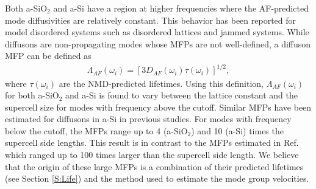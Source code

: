 \documentclass[aps,prb,twocolumn,superscriptaddress,footinbib,amsmath,amssymb,floatfix]{revtex4}
\begin{document}
Both a-SiO$_2$ and a-Si have a region at higher frequencies where the 
AF-predicted mode diffusivities are relatively constant. This behavior 
has been reported for model disordered systems such as 
disordered lattices\cite{sheng_heat_1991,beltukov_ioffe-regel_2013,
larkin_predicting_2013} and jammed systems.
\cite{xu_energy_2009,vitelli_heat_2010}  
While diffusons are non-propagating modes whose MFPs are not 
well-defined,\cite{feldman_thermal_1993} 
a diffuson MFP can be defined as
\begin{equation}\label{EQ:LambdaAF}
\begin{split}
\Lambda_{AF}(\omega_i) = [3D_{AF}(\omega_i)\tau(\omega_i)]^{1/2},
\end{split}
\end{equation}
where $\tau(\omega_{i})$ are the NMD-predicted lifetimes. Using this 
definition, $\Lambda_{AF}(\omega_i)$ for both a-SiO$_2$ and a-Si 
is found to vary between the lattice constant and 
the supercell size for modes with frequency above the cutoff. 
Similar MFPs have been estimated for diffusons in a-Si in 
previous studies.\cite{feldman_thermal_1993,feldman_numerical_1999} 
For modes with frequency below the cutoff, the MFPs range up to 
4 (a-SiO$_2$) and 10 (a-Si) times the supercell side lengths. 
This result is in contrast to the MFPs estimated in 
Ref. 
which ranged up to 100 times larger than the 
supercell side length. We believe that the origin of these large MFPs 
is a combination of their predicted lifetimes 
(see Section \ref{S:Life}) 
and the method used to estimate the mode group velocities.
\end{document}
